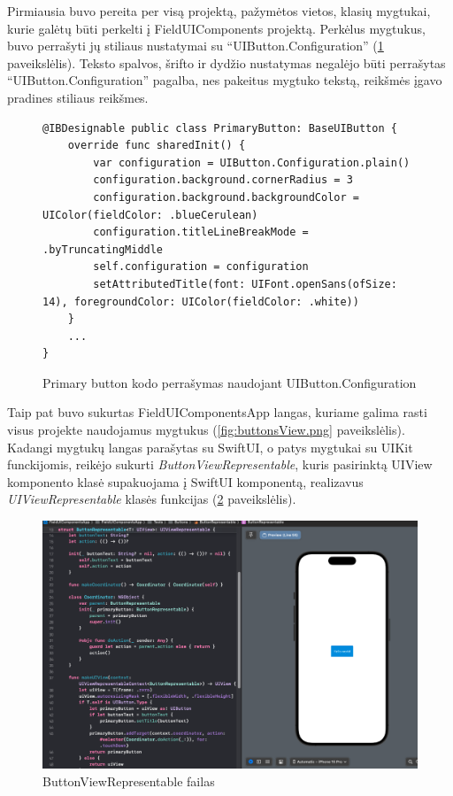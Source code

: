 Pirmiausia buvo pereita per visą projektą, pažymėtos vietos, klasių mygtukai, kurie galėtų būti perkelti į FieldUIComponents projektą. Perkėlus mygtukus, buvo perrašyti jų stiliaus nustatymai su \enquote{UIButton.Configuration} (\ref{fig:Primary button} paveikslėlis). Teksto spalvos, šrifto ir dydžio nustatymas negalėjo būti perrašytas \enquote{UIButton.Configuration} pagalba, nes pakeitus mygtuko tekstą, reikšmės įgavo pradines stiliaus reikšmes. 

\begin{figure}[htbp!]
    \centering
    \begin{verbatim}
@IBDesignable public class PrimaryButton: BaseUIButton {
    override func sharedInit() {
        var configuration = UIButton.Configuration.plain()
        configuration.background.cornerRadius = 3
        configuration.background.backgroundColor = UIColor(fieldColor: .blueCerulean)
        configuration.titleLineBreakMode = .byTruncatingMiddle
        self.configuration = configuration
        setAttributedTitle(font: UIFont.openSans(ofSize: 14), foregroundColor: UIColor(fieldColor: .white))
    }
    ...
}
    \end{verbatim}
    \caption{Primary button kodo perrašymas naudojant UIButton.Configuration}
    \label{fig:Primary button}
\end{figure}


Taip pat buvo sukurtas FieldUIComponentsApp langas, kuriame galima rasti visus projekte naudojamus mygtukus (\ref{fig:buttonsView.png} paveikslėlis). Kadangi mygtukų langas parašytas su SwiftUI, o patys mygtukai su UIKit funckijomis, reikėjo sukurti \textit{ButtonViewRepresentable}, kuris pasirinktą UIView komponento klasė supakuojama į SwiftUI komponentą, realizavus \textit{UIViewRepresentable} klasės funkcijas (\ref{fig:buttonViewRepresentable} paveikslėlis).

\begin{figure} [htbp!]
    \centering
    \includegraphics[width=1\textwidth]{Images/iOSButtonRepresentable.png}
    \caption{ButtonViewRepresentable failas}
    \label{fig:buttonViewRepresentable}
\end{figure}

